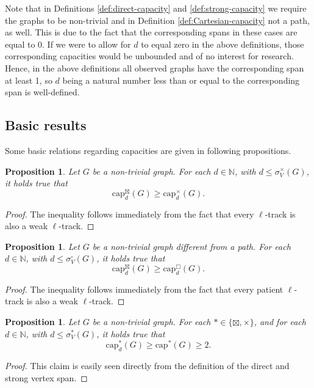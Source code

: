 \documentclass{article}
\newtheorem{proposition}[theorem]{Proposition}
\newcommand{\dcap}[2]{\mathrm{cap}^{\times}_{#1}(#2)}
\newcommand{\scap}[2]{\mathrm{cap}^{\boxtimes}_{#1}(#2)}
\newcommand{\ccap}[2]{\mathrm{cap}^{\mathbin{\Box}}_{#1}(#2)}
\begin{document}
Note that in Definitions \ref{def:direct-capacity} and \ref{def:strong-capacity} we require the graphs to be non-trivial and in Definition \ref{def:Cartesian-capacity} not a path, as well. This is due to the fact that the corresponding spans in these cases are equal to 0. If we were to allow for $d$ to equal zero in the above definitions, those corresponding capacities would be unbounded and of no interest for research. Hence, in the above definitions all observed graphs have the corresponding span at least 1, so $d$ being a natural number less than or equal to the corresponding span is well-defined. 

\subsection{Basic results}

Some basic relations regarding capacities are given in following propositions.  

\begin{proposition}\label{prop:basic1a}
    Let $G$ be a non-trivial graph. For each $d\in\mathbb{N}$, with $d\leq \sigma^\times_V(G)$, it holds true that
    $$\scap{d}{G}\geq \dcap{d}{G}.$$
\end{proposition}
\begin{proof}
    The inequality follows immediately from the fact that every $\ell$-track is also a weak $\ell$-track.
\end{proof}

\begin{proposition}\label{prop:basic1b}
    Let $G$ be a non-trivial graph different from a path. For each $d\in\mathbb{N}$, with $d \leq \sigma^\square_V(G)$, it holds true that
    $$\scap{d}{G}\geq \ccap{d}{G}.$$
\end{proposition}
\begin{proof}
    The inequality follows immediately from the fact that every patient $\ell$-track is also a weak $\ell$-track.
\end{proof}

\begin{proposition}\label{prop:basic2a}
    Let $G$ be a non-trivial graph. For each $\mathbin{\ast} \in \{\boxtimes,\times\}$, and for each $d\in\mathbb{N}$, with $d\leq\sigma^\ast_V(G)$, it holds true that
    $$\mathrm{cap}_{d}^{\ast}(G)\geq \mathrm{cap}^{\ast}(G)\geq 2.$$
\end{proposition}

\begin{proof}
    This claim is easily seen directly from the definition of the direct and strong vertex span.
\end{proof}
\end{document}
